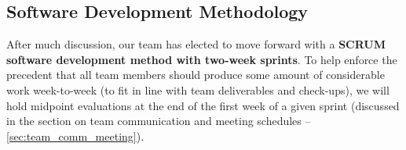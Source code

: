 \subsection{Software Development Methodology}

After much discussion, our team has elected to move forward with a \textbf{SCRUM software development method with two-week sprints}. To help enforce the precedent that all team members should produce some amount of considerable work week-to-week (to fit in line with team deliverables and check-ups), we will hold midpoint evaluations at the end of the first week of a given sprint (discussed in the section on team communication and meeting schedules -- \ref{sec:team_comm_meeting}).